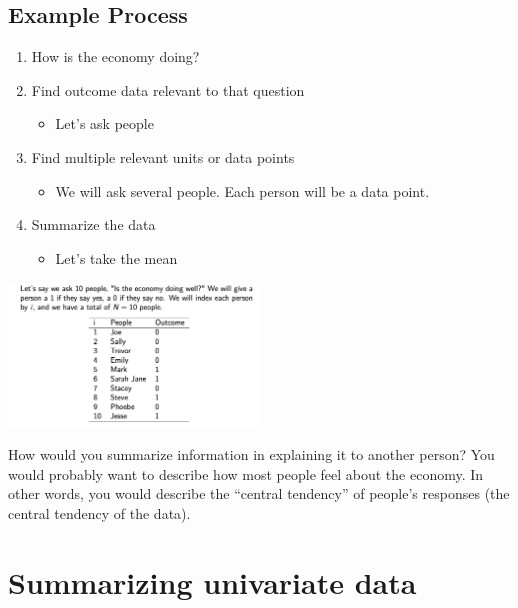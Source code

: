\documentclass[
  letterpaper,
  DIV=11,
  numbers=noendperiod]{scrreprt}
\providecommand{\tightlist}{%
  \setlength{\itemsep}{0pt}\setlength{\parskip}{0pt}}\usepackage{longtable,booktabs,array}
\begin{document}
\hypertarget{example-process}{%
\subsection{Example Process}\label{example-process}}

\begin{enumerate}
\def\labelenumi{\arabic{enumi}.}
\tightlist
\item
  How is the economy doing?
\item
  Find outcome data relevant to that question

  \begin{itemize}
  \tightlist
  \item
    Let's ask people
  \end{itemize}
\item
  Find multiple relevant units or data points

  \begin{itemize}
  \tightlist
  \item
    We will ask several people. Each person will be a data point.
  \end{itemize}
\item
  Summarize the data

  \begin{itemize}
  \tightlist
  \item
    Let's take the mean
  \end{itemize}
\end{enumerate}

\includegraphics[width=0.5\textwidth,height=\textheight]{images/economysurvey.png}

How would you summarize information in explaining it to another person?
You would probably want to describe how most people feel about the
economy. In other words, you would describe the ``central tendency'' of
people's responses (the central tendency of the data).

\hypertarget{summarizing-univariate-data}{%
\section{Summarizing univariate
data}\label{summarizing-univariate-data}}
\end{document}
